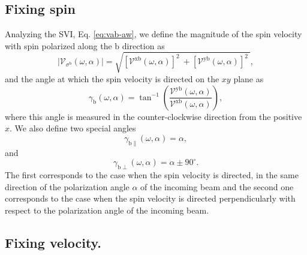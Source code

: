 \documentclass[prb,11pt,tightenlines,twocolumn,aps]{revtex4-1}
\begin{document}
\subsection{Fixing spin}\label{sec:theory-fixspin}

Analyzing the SVI, Eq. \eqref{eq:vab-aw}, we define the magnitude of the spin
velocity with spin polarized along the $\mathrm{b}$ direction as
\begin{equation}
|\mathcal{V}_{\sigma^{\mathrm{b}}}(\omega,\alpha)| 
=
\sqrt{
[\mathcal{V}^{\mathrm{xb}}(\omega,\alpha)]^{2}\ +
[\mathcal{V}^{\mathrm{yb}}(\omega,\alpha)]^{2}\ 
}, 
\label{eq:vs-mag}
\end{equation}
and the angle at which the spin velocity is directed on the $xy$ plane as
\begin{equation}
\gamma_{\mathrm{b}} (\omega,\alpha)
=
\tan^{-1} \left( \frac{\mathcal{V}^{\mathrm{yb}}(\omega,\alpha)}
{\mathcal{V}^{\mathrm{xb}}(\omega,\alpha)} \right),
\label{eq:gamma-ang}
\end{equation}
where this angle is measured in the counter-clockwise direction from the
positive $x$. We also define two special angles
\begin{equation}
\gamma_{\mathrm{b \parallel}}(\omega,\alpha) = \alpha, 
\label{eq:gamma-par} 
\end{equation}
and
\begin{equation}
\gamma_{\mathrm{b \perp}}(\omega,\alpha) = \alpha \pm 90^{\circ}.
\label{eq:gamma-perp}
\end{equation}
The first corresponds to the case when the spin velocity is directed, in the
same direction of the polarization angle $\alpha$ of the incoming beam and the
second one corresponds to the case when the spin velocity is directed
perpendicularly with respect to the polarization angle of the incoming beam.



\subsection{Fixing velocity.}\label{sec:theory-fixvel}
\end{document}
